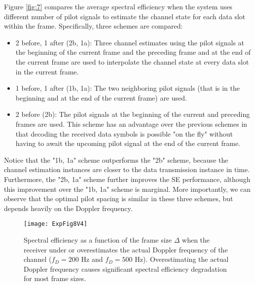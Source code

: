 \documentclass[conference, a4paper, 10pt]{IEEEtran}
\begin{document}
Figure \ref{fig:7} compares the average spectral efficiency when the system uses different
number of pilot signals to estimate the channel state for each data slot within the frame.
Specifically, three schemes are compared:
\begin{itemize}
\item
2 before, 1 after (2b, 1a): Three channel estimates using the pilot signals at the beginning
of the current frame and the preceding frame and at the end of the current frame are used
to interpolate the channel state at every data slot in the current frame.
\item
1 before, 1 after (1b, 1a): The two neighboring pilot signals (that is in the beginning and at the end
of the current frame) are used.
\item
2 before (2b): The pilot signals at the beginning of the current and preceding frames are used.
This scheme has an advantage over the previous schemes in that decoding the received data symbols
is possible "on the fly" without having to await the upcoming pilot signal at the end of the
current frame.
\end{itemize}

Notice that the "1b, 1a" scheme outperforms the "2b" scheme, because the channel estimation
instances are closer to the data transmission instance in time. Furthermore, the "2b, 1a"
scheme further improves the \ac{SE} performance, although this improvement over the
"1b, 1a" scheme is marginal. More importantly, we can observe that the optimal pilot
spacing is similar in these three schemes, but depends heavily on the Doppler frequency.

\begin{figure}[t]
\begin{center}
\texttt{[image: ExpFig8V4]}
\caption{
Spectral efficiency as a function of the frame size $\Delta$ when the receiver under or overestimates the actual Doppler frequency of the channel ($f_D=200$ Hz and $f_D=500$ Hz). Overestimating the actual Doppler frequency causes significant spectral efficiency degradation for most frame sizes.
}
\label{fig:8}
\end{center}
\end{figure}
\end{document}
